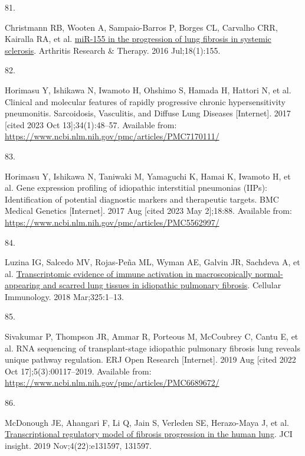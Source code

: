 \documentclass[
]{article}
\newlength{\cslhangindent}
\newlength{\csllabelwidth}
\newlength{\cslentryspacingunit} %
\newenvironment{CSLReferences}[2] %
 {%
  \setlength{\parindent}{0pt}
  \ifodd #1
  \let\oldpar\par
  \def\par{\hangindent=\cslhangindent\oldpar}
  \fi
  \setlength{\parskip}{#2\cslentryspacingunit}
 }%
 {}
\newcommand{\CSLLeftMargin}[1]{\parbox[t]{\csllabelwidth}{#1}}
\newcommand{\CSLRightInline}[1]{\parbox[t]{\linewidth - \csllabelwidth}{#1}\break}
\begin{document}
\begin{CSLReferences}{0}{0}
\leavevmode{}%
\CSLLeftMargin{81. }%
\CSLRightInline{Christmann RB, Wooten A, Sampaio-Barros P, Borges CL, Carvalho CRR, Kairalla RA, et al. \href{https://doi.org/10.1186/s13075-016-1054-6}{{miR}-155 in the progression of lung fibrosis in systemic sclerosis}. Arthritis Research \& Therapy. 2016 Jul;18(1):155. }

\leavevmode{}%
\CSLLeftMargin{82. }%
\CSLRightInline{Horimasu Y, Ishikawa N, Iwamoto H, Ohshimo S, Hamada H, Hattori N, et al. Clinical and molecular features of rapidly progressive chronic hypersensitivity pneumonitis. Sarcoidosis, Vasculitis, and Diffuse Lung Diseases {[}Internet{]}. 2017 {[}cited 2023 Oct 13{]};34(1):48--57. Available from: \url{https://www.ncbi.nlm.nih.gov/pmc/articles/PMC7170111/}}

\leavevmode{}%
\CSLLeftMargin{83. }%
\CSLRightInline{Horimasu Y, Ishikawa N, Taniwaki M, Yamaguchi K, Hamai K, Iwamoto H, et al. Gene expression profiling of idiopathic interstitial pneumonias ({IIPs}): Identification of potential diagnostic markers and therapeutic targets. BMC Medical Genetics {[}Internet{]}. 2017 Aug {[}cited 2023 May 2{]};18:88. Available from: \url{https://www.ncbi.nlm.nih.gov/pmc/articles/PMC5562997/}}

\leavevmode{}%
\CSLLeftMargin{84. }%
\CSLRightInline{Luzina IG, Salcedo MV, Rojas-Peña ML, Wyman AE, Galvin JR, Sachdeva A, et al. \href{https://doi.org/10.1016/j.cellimm.2018.01.002}{Transcriptomic evidence of immune activation in macroscopically normal-appearing and scarred lung tissues in idiopathic pulmonary fibrosis}. Cellular Immunology. 2018 Mar;325:1--13. }

\leavevmode{}%
\CSLLeftMargin{85. }%
\CSLRightInline{Sivakumar P, Thompson JR, Ammar R, Porteous M, McCoubrey C, Cantu E, et al. {RNA} sequencing of transplant-stage idiopathic pulmonary fibrosis lung reveals unique pathway regulation. ERJ Open Research {[}Internet{]}. 2019 Aug {[}cited 2022 Oct 17{]};5(3):00117--2019. Available from: \url{https://www.ncbi.nlm.nih.gov/pmc/articles/PMC6689672/}}

\leavevmode{}%
\CSLLeftMargin{86. }%
\CSLRightInline{McDonough JE, Ahangari F, Li Q, Jain S, Verleden SE, Herazo-Maya J, et al. \href{https://doi.org/10.1172/jci.insight.131597}{Transcriptional regulatory model of fibrosis progression in the human lung}. JCI insight. 2019 Nov;4(22):e131597, 131597. }


\end{CSLReferences}
\end{document}
